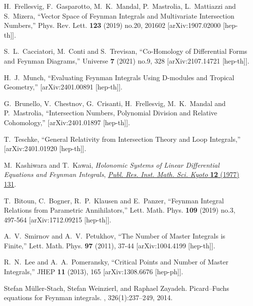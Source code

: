 \documentclass[a4paper,12pt]{article}
\numberwithin{equation}{section}
\numberwithin{figure}{section}
\begin{document}
\begin{thebibliography}{99}
H.~Frellesvig, F.~Gasparotto, M.~K.~Mandal, P.~Mastrolia, L.~Mattiazzi and S.~Mizera,
``Vector Space of Feynman Integrals and Multivariate Intersection Numbers,''
Phys. Rev. Lett. \textbf{123} (2019) no.20, 201602
[arXiv:1907.02000 [hep-th]].
    
S.~L.~Cacciatori, M.~Conti and S.~Trevisan,
``Co-Homology of Differential Forms and Feynman Diagrams,''
Universe \textbf{7} (2021) no.9, 328
[arXiv:2107.14721 [hep-th]].

H.~J.~Munch,
``Evaluating Feynman Integrals Using D-modules and Tropical Geometry,''
[arXiv:2401.00891 [hep-th]].
  
G.~Brunello, V.~Chestnov, G.~Crisanti, H.~Frellesvig, M.~K.~Mandal and P.~Mastrolia,
``Intersection Numbers, Polynomial Division and Relative Cohomology,''
[arXiv:2401.01897 [hep-th]].

T.~Teschke,
``General Relativity from Intersection Theory and Loop Integrals,''
[arXiv:2401.01920 [hep-th]].
  


M.~Kashiwara and T.~Kawai, \emph{{Holonomic Systems of Linear Differential
		Equations and Feynman Integrals}},
\href{https://doi.org/10.2977/prims/1195196602}{\emph{Publ. Res. Inst. Math.
		Sci. Kyoto} {\bfseries 12} (1977) 131}.

  
T.~Bitoun, C.~Bogner, R.~P.~Klausen and E.~Panzer,
``Feynman Integral Relations from Parametric Annihilators,''
Lett. Math. Phys. \textbf{109} (2019) no.3, 497-564
[arXiv:1712.09215 [hep-th]].

A.~V.~Smirnov and A.~V.~Petukhov,
``The Number of Master Integrals is Finite,''
Lett. Math. Phys. \textbf{97} (2011), 37-44
[arXiv:1004.4199 [hep-th]].



R.~N.~Lee and A.~A.~Pomeransky,
``Critical Points and Number of Master Integrals,''
JHEP \textbf{11} (2013), 165
[arXiv:1308.6676 [hep-ph]].



Stefan M{\"u}ller-Stach, Stefan Weinzierl, and Raphael Zayadeh.
\newblock Picard--{F}uchs equations for {F}eynman integrals.
,
326(1):237--249, 2014.
\newblock [arXiv:1212.4389]
  

\end{thebibliography}
\end{document}
